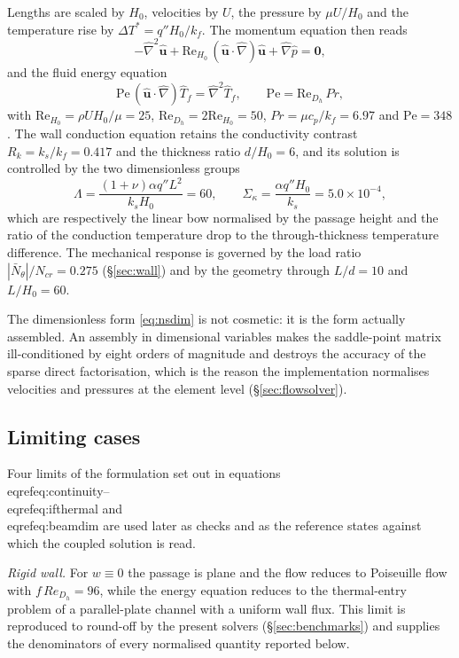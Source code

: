 \documentclass[11pt,a4paper]{article}
\newcommand{\bu}{\mathbf u}
\newcommand{\ReDh}{\mathrm{Re}_{D_h}}
\newcommand{\ReH}{\mathrm{Re}_{H_0}}
\begin{document}
Lengths are scaled by $H_0$, velocities by $U$, the pressure by $\mu U/H_0$
and the temperature rise by $\Delta T^{*}=q''H_0/k_f$. The momentum equation
then reads
\begin{equation}
-\hat\nabla^2\hat{\bu}+\ReH\,(\hat{\bu}\cdot\hat\nabla)\hat{\bu}
+\hat\nabla\hat p=\mathbf 0,
\label{eq:nsdim}
\end{equation}
and the fluid energy equation
\begin{equation}
\mathrm{Pe}\,(\hat{\bu}\cdot\hat\nabla)\hat T_f=\hat\nabla^2\hat T_f,
\qquad \mathrm{Pe}=\ReDh\,Pr,
\label{eq:energydim}
\end{equation}
with $\ReH=\rho U H_0/\mu=25$, $\ReDh=2\ReH=50$, $Pr=\mu c_p/k_f=6.97$ and
$\mathrm{Pe}=348$. The wall conduction equation retains the conductivity
contrast $R_k=k_s/k_f=0.417$ and the thickness ratio $d/H_0=6$, and its
solution is controlled by the two dimensionless groups
\begin{equation}
\Lambda=\frac{(1+\nu)\alpha q''L^2}{k_s H_0}=60,
\qquad
\Sigma_\kappa=\frac{\alpha q''H_0}{k_s}=5.0\times10^{-4},
\label{eq:groups}
\end{equation}
which are respectively the linear bow normalised by the passage height and the
ratio of the conduction temperature drop to the through-thickness temperature
difference. The mechanical response is governed by the load ratio
$|\bar N_\theta|/N_{cr}=0.275$ (\S\ref{sec:wall}) and by the geometry through
$L/d=10$ and $L/H_0=60$.

The dimensionless form \eqref{eq:nsdim} is not cosmetic: it is the form
actually assembled. An assembly in dimensional variables makes the
saddle-point matrix ill-conditioned by eight orders of magnitude and destroys
the accuracy of the sparse direct factorisation, which is the reason the
implementation normalises velocities and pressures at the element level
(\S\ref{sec:flowsolver}).

\subsection{Limiting cases}
\label{sec:limits}

Four limits of the formulation set out in equations
\\eqref{eq:continuity}--\\eqref{eq:ifthermal} and \\eqref{eq:beamdim} are used
later as checks and as the reference states against which the coupled solution
is read.

\emph{Rigid wall.} For $w\equiv0$ the passage is plane and the flow reduces to
Poiseuille flow with $f\,Re_{D_h}=96$, while the energy equation reduces to the
thermal-entry problem of a parallel-plate channel with a uniform wall flux. This
limit is reproduced to round-off by the present solvers (\S\ref{sec:benchmarks})
and supplies the denominators of every normalised quantity reported below.
\end{document}

